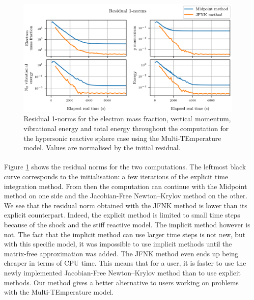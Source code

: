         \begin{figure}
          \centering
          \includegraphics{figures/sphere_mte_residuals.png}
          \caption{Residual 1-norms for the electron mass fraction, vertical momentum,  vibrational energy and total energy throughout the computation for the hypersonic reactive sphere case using the Multi-TEmperature model.
          Values are normalised by the initial residual.}
          \label{fig:sphere_mte_residuals}
        \end{figure}

        \paragraph{}
        Figure \ref{fig:sphere_mte_residuals} shows the residual norms for the two computations.
        The leftmost black curve corresponds to the initialisation: a few iterations of the explicit time integration method.
        From then the computation can continue with the Midpoint method on one side and the Jacobian-Free Newton--Krylov method on the other.
        We see that the residual norm obtained with the JFNK method is lower than its explicit counterpart.
        Indeed, the explicit method is limited to small time steps because of the shock and the stiff reactive model.
        The implicit method however is not.
        The fact that the implicit method can use larger time steps is not new, but with this specific model, it was impossible to use implicit methods until the matrix-free approximation was added.
        The JFNK method even ends up being cheaper in terms of CPU time.
        This means that for a user, it is faster to use the newly implemented Jacobian-Free Newton--Krylov method than to use explicit methods.
        Our method gives a better alternative to users working on problems with the Multi-TEmperature model.



